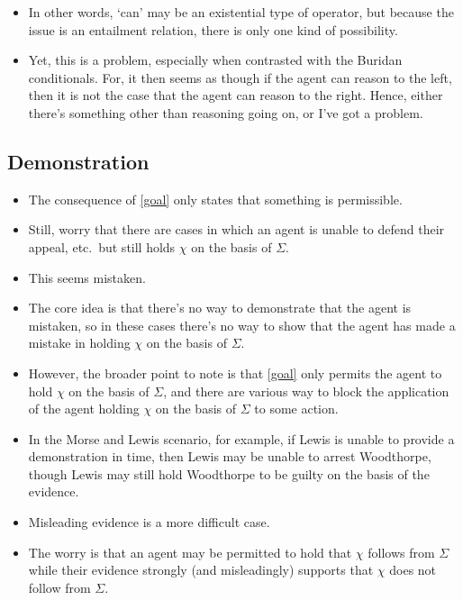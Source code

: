 \documentclass[10pt]{article}
\newcommand{\hozlinedash}[0]{%
  \noindent\hdashrule[0.5ex][c]{\textwidth}{.1pt}{2.5pt}
}
\begin{document}
\begin{itemize}
\item In other words, `can' may be an existential type of operator, but because the issue is an entailment relation, there is only one kind of possibility.
\item Yet, this is a problem, especially when contrasted with the Buridan conditionals.
  For, it then seems as though if the agent can reason to the left, then it is not the case that the agent can reason to the right.
  Hence, either there's something other than reasoning going on, or I've got a problem.
\end{itemize}

\subsection{Demonstration}
\label{sec:demonstration}

\begin{itemize}
\item The consequence of \ref{goal} only states that something is permissible.
\item Still, worry that there are cases in which an agent is unable to defend their appeal, etc.\ but still holds \(\chi\) on the basis of \(\Sigma\).
\item This seems mistaken.
\item The core idea is that there's no way to demonstrate that the agent is mistaken, so in these cases there's no way to show that the agent has made a mistake in holding \(\chi\) on the basis of \(\Sigma\).
\item However, the broader point to note is that \ref{goal} only permits the agent to hold \(\chi\) on the basis of \(\Sigma\), and there are various way to block the application of the agent holding \(\chi\) on the basis of \(\Sigma\) to some action.
\item In the Morse and Lewis scenario, for example, if Lewis is unable to provide a demonstration in time, then Lewis may be unable to arrest Woodthorpe, though Lewis may still hold Woodthorpe to be guilty on the basis of the evidence.
\end{itemize}

\hozlinedash

\begin{itemize}
\item Misleading evidence is a more difficult case.
\item The worry is that an agent may be permitted to hold that \(\chi\) follows from \(\Sigma\) while their evidence strongly (and misleadingly) supports that \(\chi\) does not follow from \(\Sigma\).
\end{itemize}
\end{document}
